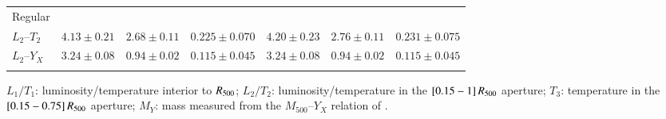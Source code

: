 \documentclass[oldversion]{aa}
\begin{document}
{\begin{table}[]
\begin{center}
\begin{tabular}{l r l l | r l l }
Regular  \\
\cline{1-1}
$L_2$--$T_2$ & $4.13\pm0.21$ & $2.68\pm0.11$ & $0.225\pm0.070$ & 
				$4.20\pm0.23$ & $2.76\pm0.11$ & $0.231\pm0.075$ \\

$L_2$--$Y_X$ & $3.24\pm0.08$ & $0.94\pm0.02$ & $0.115\pm0.045$ & 
				$3.24\pm0.08$ & $0.94\pm0.02$ & $0.115\pm0.045$  \\
\\
\hline
\end{tabular}
\end{center}
$L_1/T_1$: luminosity/temperature interior to $R_{500}$; 
$L_2/T_2$: luminosity/temperature in the $[0.15-1]\,R_{500}$ aperture; 
$T_3$: temperature in the $[0.15-0.75]\,R_{500}$ aperture; 
$M_Y$: mass measured from the $M_{500}$--$Y_X$ relation of \citet{app07}. 

\end{table}

}
\end{document}
